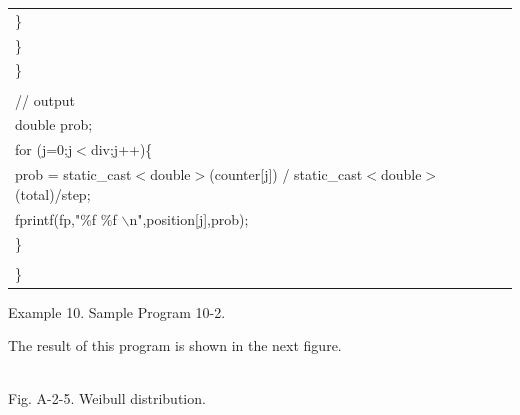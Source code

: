   
{\footnotesize
\begin{center}
\begin{tabular}{|l|}\hline

\hspace*{30mm}\}\\
\hspace*{20mm}\}\\
\hspace*{10mm}\}\\
\\
\hspace*{10mm}// output\\
\hspace*{10mm}double prob;\\
\hspace*{10mm}for (j=0;j$<$div;j++)\{\\
\hspace*{20mm}prob = static\_cast$<$double$>$(counter[j]) / static\_cast$<$double$>$(total)/step;\\
\hspace*{20mm}fprintf(fp,"\%f \%f $\backslash$n",position[j],prob);\\
\hspace*{10mm}\}\\
\hspace*{\textwidth}\\
\}\\\hline
\end{tabular}
\vspace*{5mm}

{\small
Example 10. Sample Program 10-2.
}
\end{center}
}  
  
\vspace*{5mm}

\noindent
The result of this program is shown in the next figure.

\vspace*{5mm}

\begin{center}
\\
\vspace*{10mm}
Fig. A-2-5. Weibull distribution.\\
\end{center}






